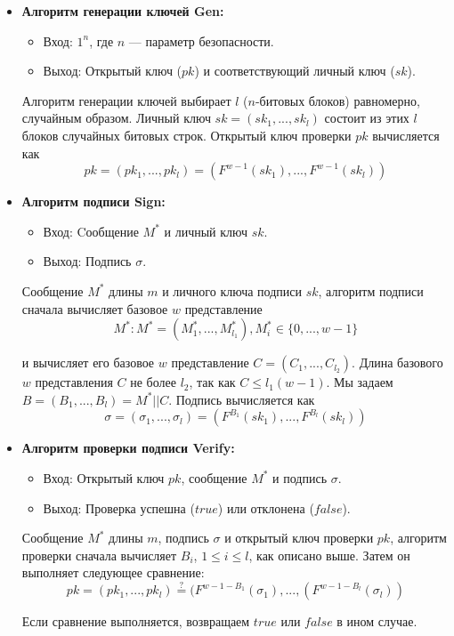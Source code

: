 \documentclass[a4paper, 14pt]{extarticle}
\begin{document}
\begin{itemize}
    \item \textbf{Алгоритм генерации ключей Gen:}

    \begin{itemize}
        \item Вход: $1^{n}$, где $n$ --- параметр безопасности.
        \item Выход: Открытый ключ ($pk$) и соответствующий личный ключ ($sk$).
    \end{itemize}
    
    Алгоритм генерации ключей выбирает $l$ ($n$-битовых блоков) равномерно, случайным образом. Личный ключ $sk = (sk_{1}, ..., sk_{l})$ состоит из этих $l$ блоков случайных битовых строк. Открытый ключ проверки $pk$ вычисляется как
    \[ pk = (pk_{1}, ..., pk_{l}) = (F^{w - 1}(sk_{1}), ..., F^{w - 1}(sk_{l})) \]

    \item \textbf{Алгоритм подписи Sign:}

    \begin{itemize}
        \item Вход: Cообщение $M^{*}$ и личный ключ $sk$.
        \item Выход: Подпись $\sigma$.
    \end{itemize}

    Сообщение $M^{*}$ длины $m$ и личного ключа подписи $sk$, алгоритм подписи сначала вычисляет базовое $w$ представление
    \[M^{*}: M^{*} = (M^{*}_{1}, ..., M^{*}_{l_{1}}), M^{*}_{i} \in \{0, ..., w - 1\}\]

    и вычисляет его базовое $w$ представление $C = (C_{1}, ..., C_{l_2})$. Длина базового $w$ представления $C$ не более $l_{2}$, так как $C \leq l_{1}(w - 1)$. Мы задаем $B = (B_{1}, ..., B_{l}) = M^{*} || C$. Подпись вычисляется как
    \[ \sigma = (\sigma_{1}, ..., \sigma_{l}) = (F^{B_1}(sk_{1}), ..., F^{B_l}(sk_{l})) \]

    \item \textbf{Алгоритм проверки подписи Verify:}

    \begin{itemize}
        \item Вход: Открытый ключ $pk$, сообщение $M^{*}$ и подпись $\sigma$.
        \item Выход: Проверка успешна ($true$) или отклонена ($false$).
    \end{itemize}

    Сообщение $M^{*}$ длины $m$, подпись $\sigma$ и открытый ключ проверки $pk$, алгоритм проверки сначала вычисляет $B_{i}$, $ 1 \leq i \leq l$, как описано выше. Затем он выполняет следующее сравнение:
    \[ pk = (pk_{1}, ..., pk_{l}) \stackrel{?}= (F^{w - 1 - B_{1}}(\sigma_{1}), ..., (F^{w - 1 - B_{l}}(\sigma_{l})) \]

    Если сравнение выполняется, возвращаем $true$ или $false$ в ином случае.
\end{itemize}
\end{document}
